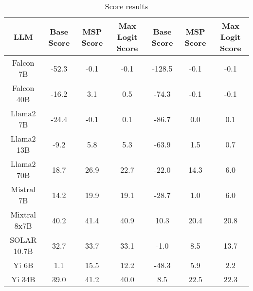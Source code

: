 \renewcommand\arraystretch{1.2}
\begin{table*}
\centering
\begin{tabular}{c|c|c|c|c|c|c}
LLM & Base Score & MSP Score & Max Logit Score & Base Score & MSP Score & Max Logit Score\\ \hline
Falcon 7B & -52.3 & -0.1 & -0.1 & -128.5 & -0.1 & -0.1\\
Falcon 40B & -16.2 & 3.1 & 0.5 & -74.3 & -0.1 & -0.1\\
Llama2 7B & -24.4 & -0.1 & 0.1 & -86.7 & 0.0 & 0.1\\
Llama2 13B & -9.2 & 5.8 & 5.3 & -63.9 & 1.5 & 0.7\\
Llama2 70B & 18.7 & 26.9 & 22.7 & -22.0 & 14.3 & 6.0\\
Mistral 7B & 14.2 & 19.9 & 19.1 & -28.7 & 1.0 & 6.0\\
Mixtral 8x7B & 40.2 & 41.4 & 40.9 & 10.3 & 20.4 & 20.8\\
SOLAR 10.7B & 32.7 & 33.7 & 33.1 & -1.0 & 8.5 & 13.7\\
Yi 6B & 1.1 & 15.5 & 12.2 & -48.3 & 5.9 & 2.2\\
Yi 34B & 39.0 & 41.2 & 40.0 & 8.5 & 22.5 & 22.3\\
\hline
\end{tabular}
\caption{Score results}
\end{table*}
\label{tab:score}
